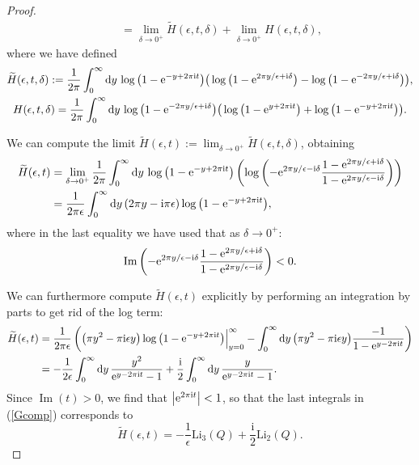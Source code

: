 \documentclass[pdftex]{sigma}
\numberwithin{equation}{section}
\begin{document}
\begin{proof}
\begin{gather*}
 \qquad{} =\lim_{\delta \to 0^+} \widetilde{H}(\epsilon,t,\delta) + \lim_{\delta\to 0^+}H(\epsilon,t,\delta),
 \end{gather*}
where we have defined
\begin{gather*}
 \widetilde{H}(\epsilon,t,\delta):=\frac{1}{2\pi}\int_{0}^{\infty}{\rm d}y \, \log\big(1-{\rm e}^{-y+2\pi \mathrm{i} t}\big)\big(\log\big(1-{\rm e}^{2\pi y/\epsilon+\mathrm{i}\delta}\big)-\log\big(1-{\rm e}^{-2\pi y/\epsilon+\mathrm{i}\delta}\big)\big),\\
 H(\epsilon,t,\delta) = \frac{1}{2\pi }\int_{0}^{\infty}{\rm d}y\, \log\big(1-{\rm e}^{-2\pi y/\epsilon +\mathrm{i}\delta}\big)\big(\log\big(1-{\rm e}^{y+2\pi \mathrm{i} t}\big)+\log\big(1-{\rm e}^{-y+2\pi \mathrm{i} t}\big)\big).
\end{gather*}

We can compute the limit $\widetilde{H}(\epsilon,t):=\lim_{\delta \to 0^+}\widetilde{H}(\epsilon,t,\delta)$, obtaining
\begin{align*}
 \widetilde{H}(\epsilon,t)&=\lim_{\delta \to 0^+}\frac{1}{2\pi}\int_{0}^{\infty}{\rm d}y\, \log\big(1-{\rm e}^{-y+2\pi \mathrm{i} t}\big)\left(\log\left(-{\rm e}^{2\pi y/\epsilon-\mathrm{i}\delta}\frac{1-{\rm e}^{2\pi y/\epsilon+\mathrm{i}\delta}}{1-{\rm e}^{2\pi y/\epsilon -\mathrm{i}\delta}}\right)\right)\\
 &=\frac{1}{2\pi \epsilon}\int_{0}^{\infty}{\rm d}y\, (2\pi y-\mathrm{i}\pi \epsilon) \log\big(1-{\rm e}^{-y+2\pi \mathrm{i} t}\big),
 \end{align*}
where in the last equality we have used that as $\delta \to 0^+$:
\begin{equation*}
 \operatorname{Im}\left(-{\rm e}^{2\pi y/\epsilon-\mathrm{i}\delta}\frac{1-{\rm e}^{2\pi y/\epsilon+\mathrm{i}\delta}}{1-{\rm e}^{2\pi y/\epsilon -\mathrm{i}\delta}}\right)<0.
\end{equation*}

We can furthermore compute $\widetilde{H}(\epsilon,t)$ explicitly by performing an integration by parts to get rid of the log term:
\begin{align}
 \widetilde{H}(\epsilon,t)&=\frac{1}{2\pi \epsilon}\left(\big(\pi y^2-\pi \mathrm{i} \epsilon y\big)\log\big(1-{\rm e}^{-y+2\pi \mathrm{i} t}\big)\Big|_{y=0}^{\infty}-\int_{0}^{\infty}{\rm d}y \, \big(\pi y^2 -\pi \mathrm{i} \epsilon y\big) \frac{-1}{1-{\rm e}^{y-2\pi \mathrm{i} t}}\right)\nonumber\\
 &=-\frac{1}{2\epsilon}\int_0^{\infty}{\rm d}y \, \frac{y^2}{{\rm e}^{y-2\pi \mathrm{i} t}-1}+\frac{{\rm i}}{2}\int_0^{\infty}{\rm d}y \, \frac{y}{{\rm e}^{y-2\pi \mathrm{i} t}-1}.\label{Gcomp}
 \end{align}
Since $\operatorname{Im}(t)>0$, we find that $\big|{\rm e}^{2\pi \mathrm{i} t}\big|<1$, so that the last integrals in (\ref{Gcomp}) corresponds to
\begin{equation*}%
 \widetilde{H}(\epsilon,t)=-\frac{1}{\epsilon}\mathrm{Li}_3(Q) +\frac{\mathrm{i}}{2}\mathrm{Li}_2(Q).
\end{equation*}


\end{proof}
\end{document}
